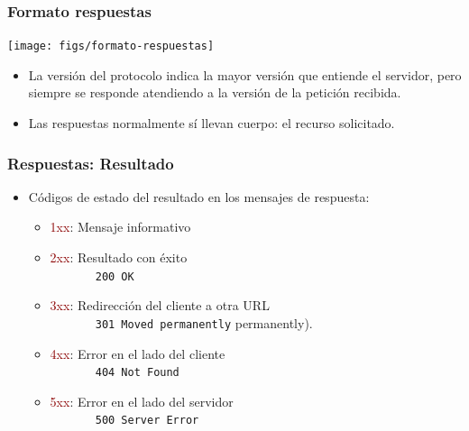 \documentclass[hyperref={pdfpagelabels=true},ucs]{beamer}
\newcommand{\res}[1]{\textcolor{darkred}{#1}}
\begin{document}



\begin{frame}[fragile, shrink=35]
\frametitle{Formato respuestas}

\begin{center}
\texttt{[image: figs/formato-respuestas]}
\end{center}


\begin{itemize}
\item La versión del protocolo indica la mayor versión que entiende el
  servidor, pero siempre se responde atendiendo a la versión de la
  petición recibida.
\item Las respuestas normalmente sí llevan cuerpo: el recurso solicitado.
\end{itemize}

\end{frame}






\begin{frame}[fragile]
\frametitle{Respuestas: Resultado}

\begin{itemize}

\item Códigos de estado del resultado en los mensajes de respuesta:

  \begin{itemize}
  \item \res{1xx}: Mensaje informativo
  \item \res{2xx}: Resultado con éxito\\
    {\scriptsize \Verb|       200 OK|}
  \item \res{3xx}: Redirección del cliente a otra URL\\
    {\scriptsize \Verb|       301 Moved permanently|}
    permanently).
  \item \res{4xx}: Error en el lado del cliente\\
    {\scriptsize  \Verb|       404 Not Found|}
  \item \res{5xx}: Error en el lado del servidor\\
    {\scriptsize  \Verb|       500 Server Error|}
  \end{itemize}

\end{itemize}

\end{frame}
\end{document}
